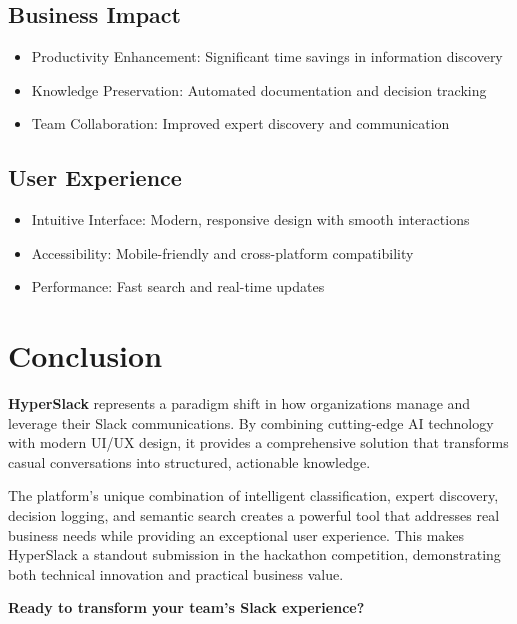 \documentclass[12pt,a4paper]{article}
\begin{document}
\subsection{Business Impact}
\begin{itemize}
    \item Productivity Enhancement: Significant time savings in information discovery
    \item Knowledge Preservation: Automated documentation and decision tracking
    \item Team Collaboration: Improved expert discovery and communication
\end{itemize}
\subsection{User Experience}
\begin{itemize}
    \item Intuitive Interface: Modern, responsive design with smooth interactions
    \item Accessibility: Mobile-friendly and cross-platform compatibility
    \item Performance: Fast search and real-time updates
\end{itemize}
\section{Conclusion}
\textbf{HyperSlack} represents a paradigm shift in how organizations manage and leverage their Slack communications. By combining cutting-edge AI technology with modern UI/UX design, it provides a comprehensive solution that transforms casual conversations into structured, actionable knowledge.

The platform's unique combination of intelligent classification, expert discovery, decision logging, and semantic search creates a powerful tool that addresses real business needs while providing an exceptional user experience. This makes HyperSlack a standout submission in the hackathon competition, demonstrating both technical innovation and practical business value.

\begin{center}
\textbf{Ready to transform your team's Slack experience?}
\end{center}
\end{document}
